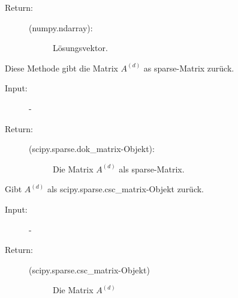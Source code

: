 \documentclass[letterpaper,10pt,ngerman, oneside, openright]{sphinxmanual}
\begin{document}
\begin{fulllineitems}
\begin{fulllineitems}
\begin{description}
\item[{Return:}] \leavevmode\begin{description}
\item[{(numpy.ndarray):}] \leavevmode
Lösungsvektor.

\end{description}

\end{description}

\end{fulllineitems}


\begin{fulllineitems}
\label{\detokenize{index:sparse_erw.Sparse.return_mat_d}}
Diese Methode gibt die Matrix $A^{(d)}$ as sparse-Matrix zurück.

\begin{description}
\item [{Input:}] -
\end{description}
\begin{description}
\item[{Return:}] \leavevmode\begin{description}
\item[{(scipy.sparse.dok\_matrix-Objekt):}] \leavevmode
Die Matrix $A^{(d)}$ als sparse-Matrix.

\end{description}

\end{description}

\end{fulllineitems}

\begin{fulllineitems}
\label{\detokenize{index:sparse_erw.Sparse.return_mat_d_csc}}
Gibt $A^{(d)}$ als scipy.sparse.csc\_matrix-Objekt zurück.

\begin{description}
\item [{Input:}] -
\end{description}
\begin{description}
\item[{Return:}] \leavevmode\begin{description}
\item[{(scipy.sparse.csc\_matrix-Objekt)}] \leavevmode
Die Matrix $A^{(d)}$


\end{description}
\end{description}
\end{fulllineitems}
\end{fulllineitems}
\end{document}
